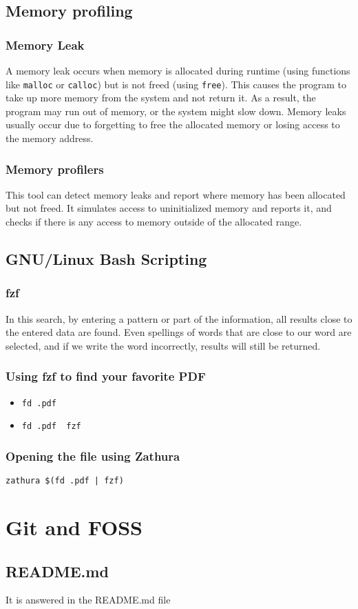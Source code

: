\documentclass{article}
\begin{document}
    \subsection{Memory profiling}
        \subsubsection{Memory Leak}
            A memory leak occurs when memory is allocated during runtime 
            (using functions like \texttt{malloc} or \texttt{calloc}) but is 
            not freed (using \texttt{free}).
             This causes the program to take up more memory from the system 
             and not return it. As a result, the program may run out of memory, 
             or the system might slow 
             down. Memory leaks usually occur due to forgetting to free the 
             allocated memory or losing access to the memory address.


        \subsubsection{Memory profilers}
            This tool can detect memory leaks and report where memory has been 
            allocated but not freed. It simulates access to uninitialized memory
             and reports it, and checks if there is any access to memory outside 
             of the allocated range.


    \subsection{GNU/Linux Bash Scripting}
        \subsubsection{fzf}
            In this search, by entering a pattern or part of the information, all
             results close to the entered data are found. Even spellings of words 
             that are close to our word are selected, and if we write the word incorrectly,
              results will still be returned.


    \subsubsection{Using fzf to find your favorite PDF}
            \begin{itemize}
                \item 
                    \texttt{fd .pdf}

                \item 
                    \texttt{fd .pdf \textbar\ fzf}
            \end{itemize}


    \subsubsection{Opening the file using Zathura}
            \hspace*{1cm} \texttt{zathura \$(fd .pdf | fzf)}

    
\section{Git and FOSS}
    \subsection{README.md}
        It is answered in the README.md file
        
\end{document}
